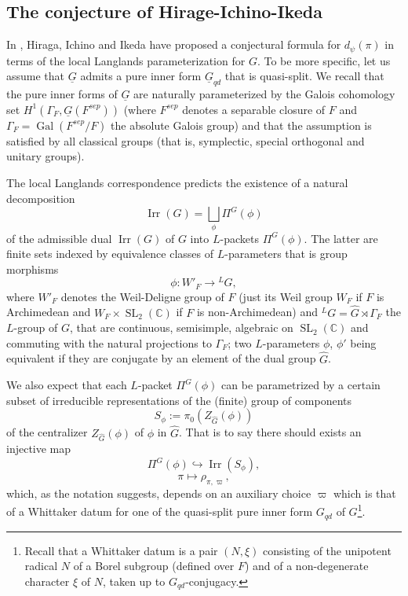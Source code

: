 \documentclass[12pt]{article}
\numberwithin{equation}{section}
\def\bC{\mathbb{C}}
\DeclareMathOperator{\Gal}{Gal}
\DeclareMathOperator{\Irr}{Irr}
\DeclareMathOperator{\SL}{\mathrm{SL}}
\begin{document}
\subsection{The conjecture of Hirage-Ichino-Ikeda}

In \cite{HII}, Hiraga, Ichino and Ikeda have proposed a conjectural formula for $d_\psi(\pi)$ in terms of the local Langlands parameterization for $G$. To be more specific, let us assume that $\underline{G}$ admits a pure inner form $\underline{G}_{qd}$ that is quasi-split. We recall that the pure inner forms of $\underline{G}$ are naturally parameterized by the Galois cohomology set $H^1(\Gamma_F, \underline{G}(F^{sep}))$ (where $F^{sep}$ denotes a separable closure of $F$ and $\Gamma_F=\Gal(F^{sep}/F)$ the absolute Galois group) and that the assumption is satisfied by all classical groups (that is, symplectic, special orthogonal and unitary groups). 

The local Langlands correspondence predicts the existence of a natural decomposition
$$\displaystyle \Irr(G)=\bigsqcup_\phi \Pi^G(\phi)$$
of the admissible dual $\Irr(G)$ of $G$ into $L$-packets $\Pi^G(\phi)$. The latter are finite sets indexed by equivalence classes of $L$-parameters that is group morphisms
$$\displaystyle \phi: W'_F\to {}^L G,$$
where $W'_F$ denotes the Weil-Deligne group of $F$ (just its Weil group $W_F$ if $F$ is Archimedean and $W_F\times \SL_2(\bC)$ if $F$ is non-Archimedean) and ${}^L G=\widehat{G}\rtimes \Gamma_F$ the $L$-group of $G$, that are continuous, semisimple, algebraic on $\SL_2(\bC)$ and commuting with the natural projections to $\Gamma_F$; two $L$-parameters $\phi$, $\phi'$ being equivalent if they are conjugate by an element of the dual group $\widehat{G}$. 

We also expect that each $L$-packet $\Pi^G(\phi)$ can be parametrized by a certain subset of irreducible representations of the (finite) group of components
$$\displaystyle S_\phi:=\pi_0(Z_{\widehat{G}}(\phi))$$
of the centralizer $Z_{\widehat{G}}(\phi)$ of $\phi$ in $\widehat{G}$. That is to say there should exists an injective map
$$\displaystyle \Pi^G(\phi)\hookrightarrow \Irr(S_\phi),$$
$$\displaystyle \pi\mapsto \rho_{\pi,\varpi},$$
which, as the notation suggests, depends on an auxiliary choice $\varpi$ which is that of a Whittaker datum for one of the quasi-split pure inner form $G_{qd}$ of $G$\footnote{Recall that a Whittaker datum is a pair $(N,\xi)$ consisting of the unipotent radical $N$ of a Borel subgroup (defined over $F$) and of a non-degenerate character $\xi$ of $N$, taken up to $G_{qd}$-conjugacy.}.
\end{document}
